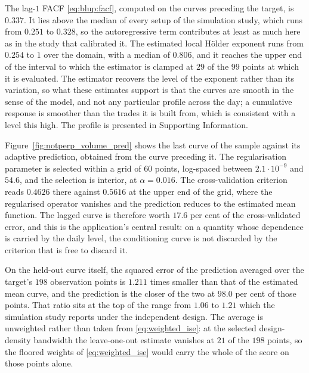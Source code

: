 The lag-$1$ FACF \eqref{eq:blup:facf}, computed on the curves preceding the target, is $0.337$. It lies above the median of every setup of the simulation study, which runs from $0.251$ to $0.328$, so the autoregressive term contributes at least as much here as in the study that calibrated it. The estimated local Hölder exponent runs from $0.254$ to $1$ over the domain, with a median of $0.806$, and it reaches the upper end of the interval to which the estimator is clamped at $29$ of the $99$ points at which it is evaluated. The estimator recovers the level of the exponent rather than its variation, so what these estimates support is that the curves are smooth in the sense of the model, and not any particular profile across the day; a cumulative response is smoother than the trades it is built from, which is consistent with a level this high. The profile is presented in Supporting Information.

Figure~\ref{fig:notperp_volume_pred} shows the last curve of the sample against its adaptive prediction, obtained from the curve preceding it. The regularisation parameter is selected within a grid of $60$ points, log-spaced between $2.1\cdot 10^{-9}$ and $54.6$, and the selection is interior, at $\alpha = 0.016$. The cross-validation criterion reads $0.4626$ there against $0.5616$ at the upper end of the grid, where the regularised operator vanishes and the prediction reduces to the estimated mean function. The lagged curve is therefore worth $17.6$ per cent of the cross-validated error, and this is the application's central result: on a quantity whose dependence is carried by the daily level, the conditioning curve is not discarded by the criterion that is free to discard it.

On the held-out curve itself, the squared error of the prediction averaged over the target's $198$ observation points is $1.211$ times smaller than that of the estimated mean curve, and the prediction is the closer of the two at $98.0$ per cent of those points. That ratio sits at the top of the range from $1.06$ to $1.21$ which the simulation study reports under the independent design. The average is unweighted rather than taken from \eqref{eq:weighted_ise}: at the selected design-density bandwidth the leave-one-out estimate vanishes at $21$ of the $198$ points, so the floored weights of \eqref{eq:weighted_ise} would carry the whole of the score on those points alone.

